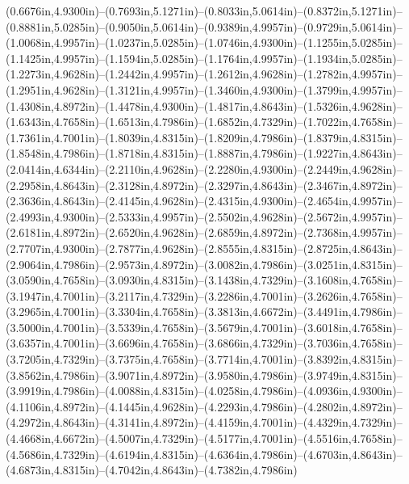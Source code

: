 (0.6676in,4.9300in)--(0.7693in,5.1271in)--(0.8033in,5.0614in)--(0.8372in,5.1271in)--(0.8881in,5.0285in)--(0.9050in,5.0614in)--(0.9389in,4.9957in)--(0.9729in,5.0614in)--(1.0068in,4.9957in)--(1.0237in,5.0285in)--(1.0746in,4.9300in)--(1.1255in,5.0285in)--(1.1425in,4.9957in)--(1.1594in,5.0285in)--(1.1764in,4.9957in)--(1.1934in,5.0285in)--(1.2273in,4.9628in)--(1.2442in,4.9957in)--(1.2612in,4.9628in)--(1.2782in,4.9957in)--(1.2951in,4.9628in)--(1.3121in,4.9957in)--(1.3460in,4.9300in)--(1.3799in,4.9957in)--(1.4308in,4.8972in)--(1.4478in,4.9300in)--(1.4817in,4.8643in)--(1.5326in,4.9628in)--(1.6343in,4.7658in)--(1.6513in,4.7986in)--(1.6852in,4.7329in)--(1.7022in,4.7658in)--(1.7361in,4.7001in)--(1.8039in,4.8315in)--(1.8209in,4.7986in)--(1.8379in,4.8315in)--(1.8548in,4.7986in)--(1.8718in,4.8315in)--(1.8887in,4.7986in)--(1.9227in,4.8643in)--(2.0414in,4.6344in)--(2.2110in,4.9628in)--(2.2280in,4.9300in)--(2.2449in,4.9628in)--(2.2958in,4.8643in)--(2.3128in,4.8972in)--(2.3297in,4.8643in)--(2.3467in,4.8972in)--(2.3636in,4.8643in)--(2.4145in,4.9628in)--(2.4315in,4.9300in)--(2.4654in,4.9957in)--(2.4993in,4.9300in)--(2.5333in,4.9957in)--(2.5502in,4.9628in)--(2.5672in,4.9957in)--(2.6181in,4.8972in)--(2.6520in,4.9628in)--(2.6859in,4.8972in)--(2.7368in,4.9957in)--(2.7707in,4.9300in)--(2.7877in,4.9628in)--(2.8555in,4.8315in)--(2.8725in,4.8643in)--(2.9064in,4.7986in)--(2.9573in,4.8972in)--(3.0082in,4.7986in)--(3.0251in,4.8315in)--(3.0590in,4.7658in)--(3.0930in,4.8315in)--(3.1438in,4.7329in)--(3.1608in,4.7658in)--(3.1947in,4.7001in)--(3.2117in,4.7329in)--(3.2286in,4.7001in)--(3.2626in,4.7658in)--(3.2965in,4.7001in)--(3.3304in,4.7658in)--(3.3813in,4.6672in)--(3.4491in,4.7986in)--(3.5000in,4.7001in)--(3.5339in,4.7658in)--(3.5679in,4.7001in)--(3.6018in,4.7658in)--(3.6357in,4.7001in)--(3.6696in,4.7658in)--(3.6866in,4.7329in)--(3.7036in,4.7658in)--(3.7205in,4.7329in)--(3.7375in,4.7658in)--(3.7714in,4.7001in)--(3.8392in,4.8315in)--(3.8562in,4.7986in)--(3.9071in,4.8972in)--(3.9580in,4.7986in)--(3.9749in,4.8315in)--(3.9919in,4.7986in)--(4.0088in,4.8315in)--(4.0258in,4.7986in)--(4.0936in,4.9300in)--(4.1106in,4.8972in)--(4.1445in,4.9628in)--(4.2293in,4.7986in)--(4.2802in,4.8972in)--(4.2972in,4.8643in)--(4.3141in,4.8972in)--(4.4159in,4.7001in)--(4.4329in,4.7329in)--(4.4668in,4.6672in)--(4.5007in,4.7329in)--(4.5177in,4.7001in)--(4.5516in,4.7658in)--(4.5686in,4.7329in)--(4.6194in,4.8315in)--(4.6364in,4.7986in)--(4.6703in,4.8643in)--(4.6873in,4.8315in)--(4.7042in,4.8643in)--(4.7382in,4.7986in) 